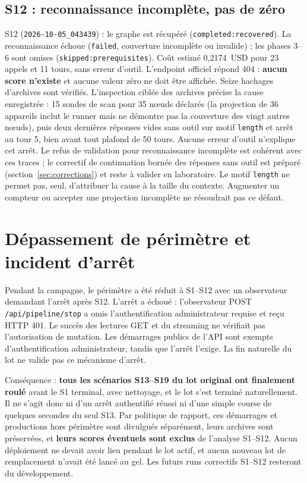 \documentclass[11pt,a4paper]{article}
\newcommand{\code}[1]{{\urlstyle{tt}\nolinkurl{#1}}}
\begin{document}
\subsection{S12 : reconnaissance incompl\`ete, pas de z\'ero}
S12 (\code{2026-10-05_043439}) : le graphe est récupéré (\code{completed:recovered}). La reconnaissance échoue (\code{failed}, couverture incomplète ou invalide) ; les phases 3--6 sont omises (\code{skipped:prerequisites}). Co\^ut estim\'e 0,2174~USD pour 23 appels et 11 tours, sans erreur d'outil. L'endpoint officiel r\'epond 404 : \textbf{aucun score n'existe} et aucune valeur z\'ero ne doit \^etre affich\'ee. Seize hachages d'archives sont v\'erifi\'es. L'inspection cibl\'ee des archives pr\'ecise la cause enregistr\'ee : 15 sondes de scan pour 35 n\oe uds d\'eclar\'es (la projection de 36 appareils inclut le runner mais ne d\'emontre pas la couverture des vingt autres n\oe uds), puis deux derni\`eres r\'eponses vides sans outil sur motif \code{length} et arr\^et au tour 5, bien avant tout plafond de 50 tours. Aucune erreur d'outil n'explique cet arr\^et. Le refus de validation pour reconnaissance incompl\`ete est coh\'erent avec ces traces ; le correctif de continuation bornée des réponses sans outil est préparé (section~\ref{sec:corrections}) et reste à valider en laboratoire. Le motif \code{length} ne permet pas, seul, d'attribuer la cause à la taille du contexte. Augmenter un compteur ou accepter une projection incompl\`ete ne r\'esoudrait pas ce d\'efaut.

\section{D\'epassement de p\'erim\`etre et incident d'arr\^et}
\label{sec:scope}
Pendant la campagne, le p\'erim\`etre a \'et\'e r\'eduit \`a S1--S12 avec un observateur demandant l'arr\^et apr\`es S12. L'arr\^et a \'echou\'e : l'observateur POST \code{/api/pipeline/stop} a omis l'authentification administrateur requise et re\c{c}u HTTP 401. Le succ\`es des lectures GET et du streaming ne v\'erifiait pas l'autorisation de mutation. Les démarrages publics de l'API sont exempts d'authentification administrateur, tandis que l'arrêt l'exige. La fin naturelle du lot ne valide pas ce mécanisme d'arrêt.

Cons\'equence : \textbf{tous les sc\'enarios S13--S19 du lot original ont finalement roul\'e} avant le S1 terminal, avec nettoyage, et le lot s'est termin\'e naturellement. Il ne s'agit donc ni d'un arr\^et authentifi\'e r\'eussi ni d'une simple course de quelques secondes du seul S13. Par politique de rapport, ces d\'emarrages et productions hors p\'erim\`etre sont divulgu\'es s\'epar\'ement, leurs archives sont pr\'eserv\'ees, et \textbf{leurs scores \'eventuels sont exclus} de l'analyse S1--S12. Aucun d\'eploiement ne devait avoir lieu pendant le lot actif, et aucun nouveau lot de remplacement n'avait été lancé au gel. Les futurs runs correctifs S1--S12 resteront du d\'eveloppement.
\end{document}
